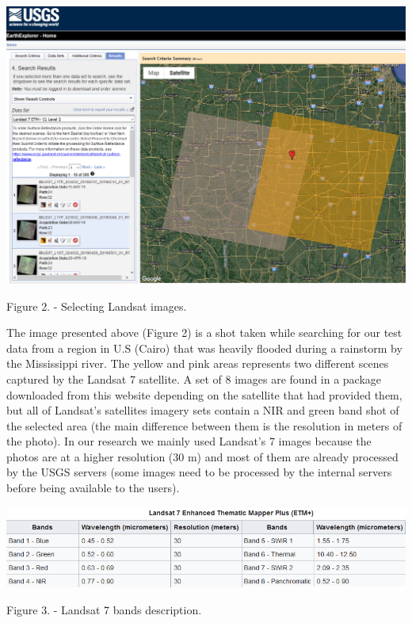 \documentclass[12pt, a4paper]{report}
\begin{document}
\bigskip

\includegraphics[scale=0.5, right]{landsat_search.png} 
\begin{center}
Figure 2. \cite{USGS} - Selecting Landsat images.
\end{center}


The image presented above (Figure 2) is a shot taken while searching for our test data from a region in U.S (Cairo) that was heavily flooded during a rainstorm by the Mississippi river. The yellow and pink areas represents two different scenes captured by the Landsat 7 satellite. A set of 8 images are found in a package downloaded from this website depending on the satellite that had provided them, but all of Landsat's satellites imagery sets contain a NIR and green band shot of the selected area (the main difference between them is the resolution in meters of the photo). In our research we mainly used Landsat's 7 images because the photos are at a higher resolution (30 m) and most of them are already processed by the USGS servers (some images need to be processed by the internal servers before being available to the users).

\includegraphics[scale=0.73, right]{Capture.png} 
\begin{center}
Figure 3. \cite{Wiki_landsat} - Landsat 7 bands description.
\end{center}
\end{document}
